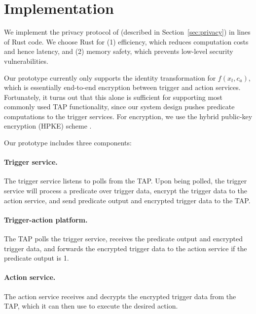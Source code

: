 \section{Implementation}
\label{sec:implementation}

We implement the privacy protocol of \sys (described in
Section~\ref{sec:privacy}) in  lines of Rust code. We choose Rust for
(1) efficiency, which reduces computation costs and hence latency, and (2)
memory safety, which prevents low-level security vulnerabilities.

Our \sys prototype currently only supports the identity transformation for
$f(x_t, c_a)$, which is essentially end-to-end encryption between trigger and
action services. Fortunately, it turns out that this alone is sufficient for
supporting most commonly used TAP functionality, since our system design pushes
predicate computations to the trigger services. For encryption, we use the
hybrid public-key encryption (HPKE) scheme .

Our prototype includes three components:

\paragraph{Trigger service.} The trigger service listens to polls from the
    TAP. Upon being polled, the trigger service will process a predicate over
    trigger data, encrypt the trigger data to the action service, and send
    predicate output and encrypted trigger data to the TAP.
    
\paragraph{Trigger-action platform.} The TAP polls the trigger service,
    receives the predicate output and encrypted trigger data, and forwards the
    encrypted trigger data to the action service if the predicate output is 1.
    
\paragraph{Action service.} The action service receives and decrypts the
    encrypted trigger data from the TAP, which it can then use to execute the
    desired action.


